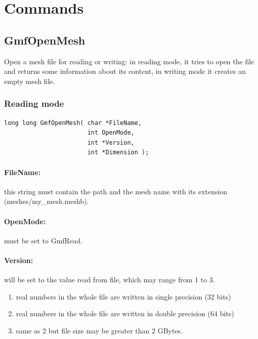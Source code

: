 \documentclass[a4paper,12pt]{article}
\begin{document}
%
%

\newpage
\section{Commands}

\subsection{GmfOpenMesh}
Open a mesh file for reading or writing: in reading mode, it tries to open the file and returns some information about its content, in writing mode it creates an empty mesh file.

\subsubsection{Reading mode}
\begin{tt}
\begin{verbatim}
long long GmfOpenMesh( char *FileName,
                       int OpenMode,
                       int *Version,
                       int *Dimension );
\end{verbatim}
\end{tt}
\normalfont

\paragraph{FileName:}
this string must contain the path and the mesh name with its extension (meshes/my\_mesh.meshb).

\paragraph{OpenMode:}
must be set to GmfRead.

\paragraph{Version:}
will be set to the value read from file, which may range from 1 to 3.

\begin{enumerate}
	\item real numbers in the whole file are written in single precision (32 bits)
	\item real numbers in the whole file are written in double precision (64 bits)
	\item same as 2 but file size may be greater than 2 GBytes.
\end{enumerate}
\end{document}

